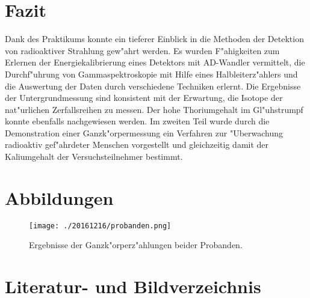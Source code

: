 \documentclass[12pt]{article}
\begin{document}
\section{Fazit}

Dank des Praktikums konnte ein tieferer Einblick in die Methoden der Detektion von radioaktiver Strahlung gew"ahrt werden. Es wurden F"ahigkeiten zum Erlernen der Energiekalibrierung eines Detektors mit AD-Wandler vermittelt, die Durchf"uhrung von Gammaspektroskopie mit Hilfe eines Halbleiterz"ahlers und die Auswertung der Daten durch verschiedene Techniken erlernt. Die Ergebnisse der Untergrundmessung sind konsistent mit der Erwartung, die Isotope der nat"urlichen Zerfallsreihen zu messen. Der hohe Thoriumgehalt im Gl"uhstrumpf konnte ebenfalls nachgewiesen werden. Im zweiten Teil wurde durch die Demonstration einer Ganzk"orpermessung ein Verfahren zur "Uberwachung radioaktiv gef"ahrdeter Menschen vorgestellt und gleichzeitig damit der Kaliumgehalt der Versuchsteilnehmer bestimmt.

\newpage
\begin{appendices}

\section{Abbildungen}

\begin{figure}[h!]
	\centering
	\texttt{[image: ./20161216/probanden.png]}
	\caption[Ganzk"orperz"ahler]{Ergebnisse der Ganzk"orperz"ahlungen beider Probanden.}
	\label{fig:probanden}
\end{figure}

\clearpage

\section{Literatur- und Bildverzeichnis}



\listoffigures

\end{appendices}
















  
\end{document}
